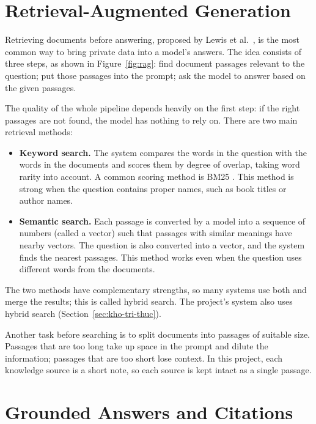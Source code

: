 \section{Retrieval-Augmented Generation}

Retrieving documents before answering, proposed by Lewis et al.\ , is the most common way to bring private data into a model's answers. The idea consists of three steps, as shown in Figure~\ref{fig:rag}: find document passages relevant to the question; put those passages into the prompt; ask the model to answer based on the given passages.


The quality of the whole pipeline depends heavily on the first step: if the right passages are not found, the model has nothing to rely on. There are two main retrieval methods:

\begin{itemize}
    \item \textbf{Keyword search.} The system compares the words in the question with the words in the documents and scores them by degree of overlap, taking word rarity into account. A common scoring method is BM25 . This method is strong when the question contains proper names, such as book titles or author names.
    \item \textbf{Semantic search.} Each passage is converted by a model into a sequence of numbers (called a vector) such that passages with similar meanings have nearby vectors. The question is also converted into a vector, and the system finds the nearest passages. This method works even when the question uses different words from the documents.
\end{itemize}

The two methods have complementary strengths, so many systems use both and merge the results; this is called hybrid search. The project's system also uses hybrid search (Section~\ref{sec:kho-tri-thuc}).

Another task before searching is to split documents into passages of suitable size. Passages that are too long take up space in the prompt and dilute the information; passages that are too short lose context. In this project, each knowledge source is a short note, so each source is kept intact as a single passage.

\section{Grounded Answers and Citations}


